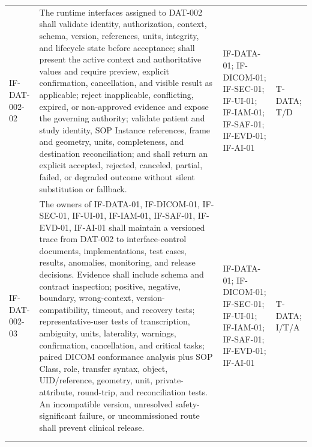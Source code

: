 \documentclass[11pt,letterpaper]{article}
\begin{document}
\begin{scriptsize}
\begin{longtable}{@{}L{0.14\textwidth}L{0.49\textwidth}L{0.19\textwidth}L{0.10\textwidth}@{}}
\mbox{IF-DAT-002-02} & The runtime interfaces assigned to DAT-002 shall validate identity, authorization, context, schema, version, references, units, integrity, and lifecycle state before acceptance; shall present the active context and authoritative values and require preview, explicit confirmation, cancellation, and visible result as applicable; reject inapplicable, conflicting, expired, or non-approved evidence and expose the governing authority; validate patient and study identity, SOP Instance references, frame and geometry, units, completeness, and destination reconciliation; and shall return an explicit accepted, rejected, canceled, partial, failed, or degraded outcome without silent substitution or fallback. & IF-DATA-01; IF-DICOM-01; IF-SEC-01; IF-UI-01; IF-IAM-01; IF-SAF-01; IF-EVD-01; IF-AI-01 & T-DATA; T\slash\allowbreak{}D \\
\addlinespace[2pt]
\mbox{IF-DAT-002-03} & The owners of IF-DATA-01, IF-DICOM-01, IF-SEC-01, IF-UI-01, IF-IAM-01, IF-SAF-01, IF-EVD-01, IF-AI-01 shall maintain a versioned trace from DAT-002 to interface-control documents, implementations, test cases, results, anomalies, monitoring, and release decisions. Evidence shall include schema and contract inspection; positive, negative, boundary, wrong-context, version-compatibility, timeout, and recovery tests; representative-user tests of transcription, ambiguity, units, laterality, warnings, confirmation, cancellation, and critical tasks; paired DICOM conformance analysis plus SOP Class, role, transfer syntax, object, UID\slash\allowbreak{}reference, geometry, unit, private-attribute, round-trip, and reconciliation tests. An incompatible version, unresolved safety-significant failure, or uncommissioned route shall prevent clinical release. & IF-DATA-01; IF-DICOM-01; IF-SEC-01; IF-UI-01; IF-IAM-01; IF-SAF-01; IF-EVD-01; IF-AI-01 & T-DATA; I\slash\allowbreak{}T\slash\allowbreak{}A \\
\addlinespace[2pt]
 \\
\addlinespace[2pt]

\end{longtable}
\end{scriptsize}
\end{document}
